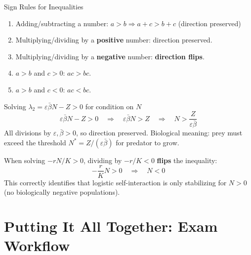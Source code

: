 \documentclass[10pt]{article}
\newcommand{\thus}{\quad\Longrightarrow\quad}
\begin{document}
\begin{rulebox}{Sign Rules for Inequalities}
\begin{enumerate}
  \item Adding/subtracting a number: $a > b \Rightarrow a + c > b + c$ (direction preserved)
  \item Multiplying/dividing by a \textbf{positive} number: direction preserved.
  \item Multiplying/dividing by a \textbf{negative} number: \textbf{direction flips}.
  \item $a > b$ and $c > 0$: $ac > bc$.
  \item $a > b$ and $c < 0$: $ac < bc$.
\end{enumerate}
\end{rulebox}

\begin{exbox}{Solving $\lambda_2 = \varepsilon\bar\beta N - Z > 0$ for condition on $N$}
\[
\varepsilon\bar\beta N - Z > 0 \thus \varepsilon\bar\beta N > Z \thus N > \frac{Z}{\varepsilon\bar\beta}
\]
All divisions by $\varepsilon, \bar\beta > 0$, so direction preserved. Biological meaning: prey must exceed the threshold $N^* = Z/(\varepsilon\bar\beta)$ for predator to grow.
\end{exbox}

\begin{warnbox}
When solving $-rN/K > 0$, dividing by $-r/K < 0$ \textbf{flips} the inequality:
\[
-\frac{r}{K}N > 0 \thus N < 0
\]
This correctly identifies that logistic self-interaction is only stabilizing for $N > 0$ (no biologically negative populations).
\end{warnbox}

\section{Putting It All Together: Exam Workflow}
\end{document}
